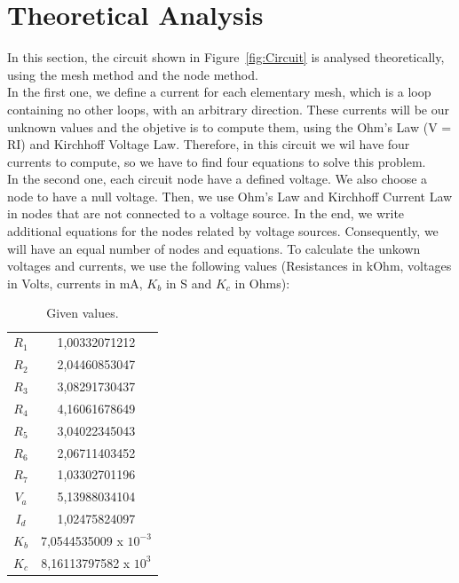 \section{Theoretical Analysis}
\label{sec:analysis}
In this section, the circuit shown in Figure~\ref{fig:Circuit} is analysed
theoretically, using the mesh method and the node method. \\
In the first one, we define a current for each elementary mesh, 
which is a loop containing no other loops, with an arbitrary direction.
These currents will be our unknown values and the objetive is to compute them, using the Ohm's Law (V = RI) and Kirchhoff Voltage Law. 
Therefore, in this circuit we wil have four currents to compute, so we have to find four equations to solve this problem. \\
\noindent In the second one, each circuit node have a defined voltage. We also choose a node to have a null voltage.
Then, we use Ohm's Law and Kirchhoff Current Law in nodes that are not connected to a voltage source.
In the end, we write additional equations for the nodes related by voltage sources.
Consequently, we will have an equal number of nodes and equations.
To calculate the unkown voltages and currents, we use the following values (Resistances in kOhm, voltages in Volts, currents in mA, $K_b$ in S and $K_c$ in Ohms):
\begin{table}[h!]
\centering
\begin{small}
\caption{Given values.} \label{Table1}
\begin{tabular}{c|c}
\hline
$R_1$ & 1,00332071212 \\
$R_2$  & 2,04460853047 \\
$R_3$  & 3,08291730437 \\
$R_4$ & 4,16061678649 \\
$R_5$  & 3,04022345043 \\
$R_6$ & 2,06711403452 \\
$R_7$ & 1,03302701196 \\
$V_a$ & 5,13988034104\\
$I_d$ & 1,02475824097 \\
$K_b$ & 7,0544535009 x $10^{-3}$ \\
$K_c$ & 8,16113797582 x $10^3$\\
\hline
\end{tabular}
\end{small}
\end{table}

\newpage

